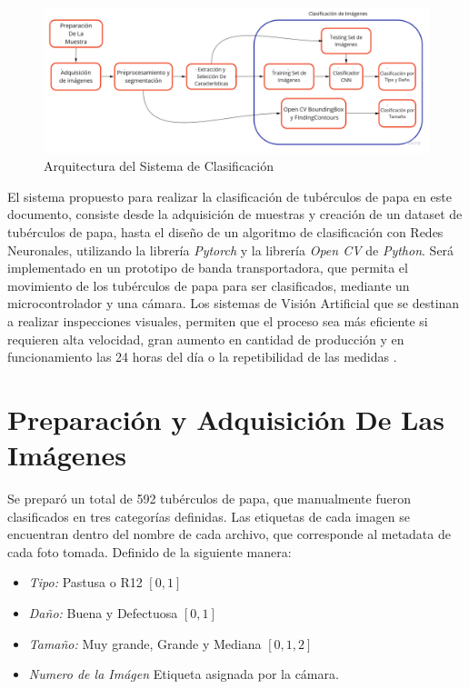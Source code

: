 \begin{figure}[ht]
	\centering
	\includegraphics[scale=0.3]{Figs/FGGeneral.jpg}
	\caption{Arquitectura del Sistema de Clasificación}
	\label{fig:flujogeneral}
\end{figure}

El sistema propuesto para realizar la clasificación de tubérculos de papa en este documento, consiste desde la adquisición de muestras y creación de un dataset de tubérculos de papa, hasta el diseño de un algoritmo de clasificación con Redes Neuronales, utilizando la librería \textit{Pytorch} y la librería \textit{Open CV} de \textit{Python}. Será implementado en un prototipo de banda transportadora, que permita el movimiento de los tubérculos de papa para ser clasificados, mediante un microcontrolador y una cámara. Los sistemas de Visión Artificial que se destinan a realizar inspecciones visuales, permiten que el proceso sea más eficiente si requieren alta velocidad, gran aumento en cantidad de producción y en funcionamiento las 24 horas del día o la repetibilidad de las medidas \cite{artificial2012aplicacion}.


\section{Preparación y Adquisición De Las Imágenes}

	Se preparó un total de 592 tubérculos de papa, que manualmente fueron clasificados en tres categorías definidas. Las etiquetas de cada imagen se encuentran dentro del nombre de cada archivo, que corresponde al metadata de cada foto tomada. Definido de la siguiente manera:
	
	\begin{itemize}
		\item \textit{Tipo:} Pastusa o R12 $[0,1]$
		\item \textit{Daño:} Buena y Defectuosa $[0,1]$
		\item \textit{Tamaño:} Muy grande, Grande y Mediana $[0,1,2]$
		\item \textit{Numero de la Imágen} Etiqueta asignada por la cámara.
	\end{itemize}	
	
